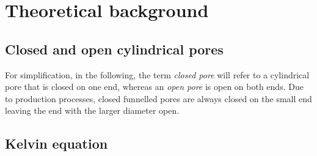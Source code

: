 \documentclass[../thesis.tex]{subfiles}
\begin{document}
  \chapter{Theoretical background}
  \label{ch:theoretical-background}

    \section{Closed and open cylindrical pores}
    \label{sec:cp-op}

      For simplification, in the following, the term \textit{closed pore} will refer to a cylindrical pore that is closed on one end, whereas an \textit{open pore} is open on both ends. Due to production processes, closed funnelled pores are always closed on the small end leaving the end with the larger diameter open.

    \section{Kelvin equation}
    \label{sec:kelvin-equation}
\end{document}
